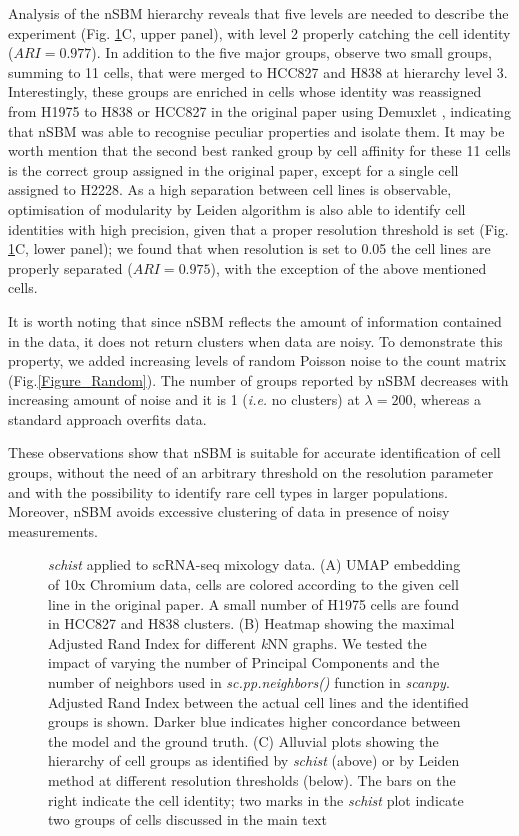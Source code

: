 \documentclass[10pt,letterpaper]{article}
\begin{document}
Analysis of the nSBM hierarchy reveals that five levels are needed to describe the experiment (Fig. \ref{Figure1}C, upper panel), with level 2 properly catching the cell identity ($ARI = 0.977$). In addition to the five major groups, observe two small groups, summing to 11 cells, that were merged to HCC827 and H838 at hierarchy level 3. Interestingly, these groups are enriched in cells whose identity was reassigned from H1975 to H838 or HCC827 in the original paper using Demuxlet \cite{kang_2018}, indicating that nSBM was able to recognise peculiar properties and isolate them. It may be worth mention that the second best ranked group by cell affinity for these 11 cells is the correct group assigned in the original paper, except for a single cell assigned to H2228.
As a high separation between cell lines is observable, optimisation of modularity by Leiden algorithm is also able to identify cell identities with high precision, given that a proper resolution threshold is set (Fig. \ref{Figure1}C, lower panel); we found that when resolution is set to 0.05 the cell lines are properly separated ($ARI = 0.975$), with the exception of the above mentioned cells.

It is worth noting that since nSBM reflects the amount of information contained in the data, it does not return clusters when data are noisy. To demonstrate this property, we added increasing levels of random Poisson noise to the count matrix (Fig.\ref{Figure_Random}). The number of groups reported by nSBM decreases with increasing amount of noise and it is 1 (\emph{i.e.} no clusters) at $\lambda=200$, whereas a standard approach overfits data. 

These observations show that nSBM is suitable for accurate identification of cell groups, without the need of an arbitrary threshold on the resolution parameter and with the possibility to identify rare cell types in larger populations. Moreover, nSBM avoids excessive clustering of data in presence of noisy measurements.

\begin{figure}[!h]
\centering
\caption[]{\emph{schist} applied to scRNA-seq mixology data. (A) UMAP embedding of 10x Chromium data, cells are colored according to the given cell line in the original paper. A small number of H1975 cells are found in HCC827 and H838 clusters. (B) Heatmap showing the maximal Adjusted Rand Index for different \emph{k}NN graphs. We tested the impact of varying the number of Principal Components and the number of neighbors used in \emph{sc.pp.neighbors()} function in \emph{scanpy}. Adjusted Rand Index between the actual cell lines and the identified groups is shown. Darker blue indicates higher concordance between the model and the ground truth. (C) Alluvial plots showing the hierarchy of cell groups as identified by \emph{schist} (above) or by Leiden method at different resolution thresholds (below). The bars on the right indicate the cell identity; two marks in the \emph{schist} plot indicate two groups of cells discussed in the main text}\label{Figure1}
\end{figure}
\end{document}
